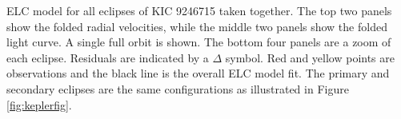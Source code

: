 \label{fig:ELCresult} ELC model for all eclipses of KIC 9246715 taken together. The top two panels show the folded radial velocities, while the middle two panels show the folded light curve. A single full orbit is shown. The bottom four panels are a zoom of each eclipse. Residuals are indicated by a $\Delta$ symbol. Red and yellow points are observations and the black line is the overall ELC model fit. The primary and secondary eclipses are the same configurations as illustrated in Figure \ref{fig:keplerfig}.
  